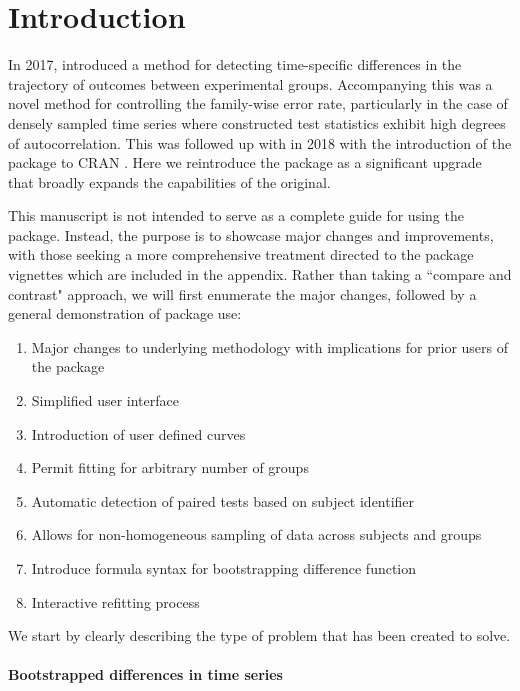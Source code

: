 \section{Introduction}



In 2017,  \citet{oleson2017detecting} introduced a method for detecting time-specific differences in the trajectory of outcomes between experimental groups. Accompanying this was a novel method for controlling the family-wise error rate, particularly in the case of densely sampled time series where constructed test statistics exhibit high degrees of autocorrelation. This was followed up with in 2018 with the introduction of the  package to CRAN \citep{seedorff2018bdots}. Here we reintroduce the  package as a significant upgrade that broadly expands the capabilities of the original.
 

This manuscript is not intended to serve as a complete guide for using the  package. Instead, the purpose is to showcase major changes and improvements, with those seeking a more comprehensive treatment directed to the package vignettes which are included in the appendix. Rather than taking a ``compare and contrast" approach, we will first enumerate the major changes, followed by a general demonstration of package use:

\begin{singlespace}
\begin{enumerate}
\item Major changes to underlying methodology with implications for prior users of the package
\item Simplified user interface
\item Introduction of user defined curves
\item Permit fitting for arbitrary number of groups
\item Automatic detection of paired tests based on subject identifier
\item Allows for non-homogeneous sampling of data across subjects and groups
\item Introduce formula syntax for bootstrapping difference function
\item Interactive refitting process
\end{enumerate}
\end{singlespace}


We start by clearly describing the type of problem that  has been created to solve.

\paragraph{Bootstrapped differences in time series}

